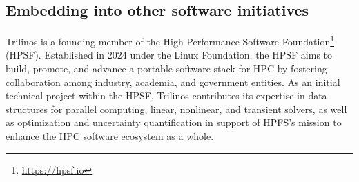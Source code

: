 \subsection{Embedding into other software initiatives}

Trilinos is a founding member of the High Performance Software Foundation\footnote{\url{https://hpsf.io}} (HPSF).
Established in 2024 under the Linux Foundation,
the HPSF aims to build, promote, and advance a portable software stack for HPC by fostering collaboration among industry, academia, and government entities.
As an initial technical project within the HPSF, Trilinos contributes its expertise in data structures for parallel computing, linear, nonlinear, and transient solvers,
as well as optimization and uncertainty quantification in support of HPFS's mission to enhance the HPC software ecosystem as a whole.
